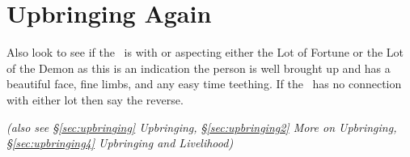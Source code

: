 \section{Upbringing Again}
\label{sec:upbringing3}

Also look to see if the \Moon\, is with or aspecting either the Lot of Fortune or the Lot of the Demon as this is an indication the person is well brought up and has a beautiful face, fine limbs, and any easy time teething. If the \Moon\, has no connection with either lot then say the reverse.

\textsl{\small(also see \S\ref{sec:upbringing} Upbringing, \S\ref{sec:upbringing2} More on Upbringing, \S\ref{sec:upbringing4} Upbringing and Livelihood)}